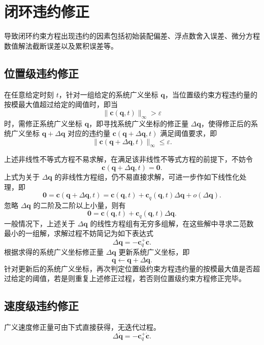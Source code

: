 \section{闭环违约修正}

导致闭环约束方程出现违约的因素包括初始装配偏差、浮点数舍入误差、微分方程数值解法截断误差以及累积误差等。

\subsection{位置级违约修正}

在任意给定时刻 $t$，针对一组给定的系统广义坐标 $\boldsymbol{q}$，当位置级约束方程违约量的按模最大值超过给定的阈值时，即当
\begin{equation}\label{eq:10.62}
  \|\boldsymbol{c}(\boldsymbol{q}, t)\|_\infty > \varepsilon
\end{equation}
时，需修正系统广义坐标 $\boldsymbol{q}$，即寻找系统广义坐标的修正量 $\Delta\boldsymbol{q}$，使得修正后的系统广义坐标 $\boldsymbol{q} + \Delta\boldsymbol{q}$ 对应的违约量 $\boldsymbol{c}(\boldsymbol{q} + \Delta\boldsymbol{q}, t)$ 满足阈值要求，即
\begin{equation}\label{eq:10.63}
  \|\boldsymbol{c}(\boldsymbol{q} + \Delta\boldsymbol{q}, t)\|_\infty \le \varepsilon.
\end{equation}

上述非线性不等式方程不易求解，在满足该非线性不等式方程的前提下，不妨令
\begin{equation}\label{eq:10.64}
  \boldsymbol{c}(\boldsymbol{q} + \Delta\boldsymbol{q}, t) = \boldsymbol{0}.
\end{equation}
上式为关于 $\Delta\boldsymbol{q}$ 的非线性方程组，仍不易直接求解，可进一步作如下线性化处理，即
\begin{equation}\label{eq:10.65}
  \boldsymbol{0} = \boldsymbol{c}(\boldsymbol{q} + \Delta\boldsymbol{q}, t) = \boldsymbol{c}(\boldsymbol{q}, t) + \boldsymbol{c}_q(\boldsymbol{q}, t) \Delta\boldsymbol{q} + o(\Delta\boldsymbol{q}).
\end{equation}
忽略 $\Delta\boldsymbol{q}$ 的二阶及二阶以上小量，则有
\begin{equation}\label{eq:10.66}
  \boldsymbol{0} = \boldsymbol{c}(\boldsymbol{q}, t) + \boldsymbol{c}_q(\boldsymbol{q}, t) \Delta\boldsymbol{q}.
\end{equation}
一般情况下，上述关于 $\Delta\boldsymbol{q}$ 的线性方程组有无穷多组解，在这些解中寻求二范数最小的一组解，求解过程不妨简记为如下表达式
\begin{equation}\label{eq:10.67}
  \Delta\boldsymbol{q} = -\boldsymbol{c}_q^+ \boldsymbol{c}.
\end{equation}
根据求得的系统广义坐标修正量 $\Delta\boldsymbol{q}$ 更新系统广义坐标，即
\begin{equation}\label{eq:10.68}
  \boldsymbol{q} \leftarrow \boldsymbol{q} + \Delta\boldsymbol{q}.
\end{equation}
针对更新后的系统广义坐标，再次判定位置级约束方程违约量的按模最大值是否超过给定的阈值，若是则重复上述修正过程，若否则位置级约束方程修正完毕。

\subsection{速度级违约修正}

广义速度修正量可由下式直接获得，无迭代过程。
\begin{equation}\label{eq:10.69}
  \Delta\dot{\boldsymbol{q}} = -\boldsymbol{c}_q^+ \dot{\boldsymbol{c}}.
\end{equation}
